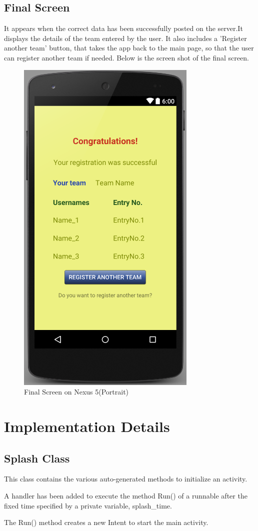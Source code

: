 \documentclass{article}
\begin{document}
\subsection{Final Screen}
It appears when the correct data has been successfully posted on the server.It displays the details of the team entered by the user. It also includes a 'Register another team' button, that takes the app back to the main page, so that the user can register another team if needed. Below is the screen shot of the final screen.

\begin{figure}
	\centering
  \includegraphics[scale=0.75]{N5-Final.PNG}
  \caption{ Final Screen on Nexus 5(Portrait)}
  \label{n5final}
\end{figure}

\section{Implementation Details}
\subsection{Splash Class}
\par\noindent This class contains the various auto-generated methods to initialize an activity.
\par\noindent A handler has been added to execute the method Run() of a runnable after the fixed time specified by a private variable, splash\_time.
\par\noindent The Run() method creates a new Intent to start the main activity.
\end{document}
